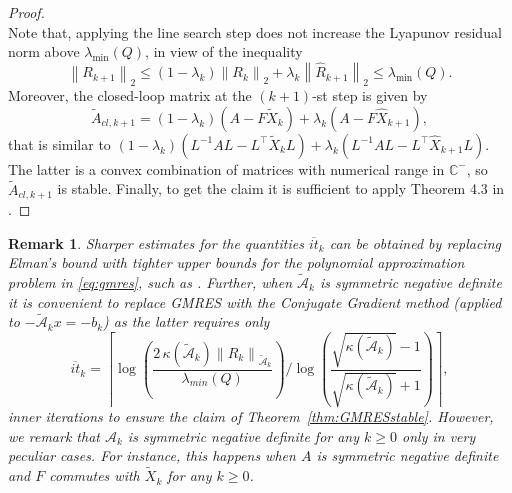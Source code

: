 \documentclass[a4paper,10pt]{article}
\newcommand{\norm}[1]{\left\lVert#1\right\rVert}
\newtheorem{remark}{Remark}
\newcommand{\upd}[1]{{\color{black}#1}} %
\begin{document}
\begin{proof}
$$$$
Note that, applying the line search step does not increase the Lyapunov residual norm above $\lambda_{\min}(Q)$, in view of the inequality
$$
\norm{R_{k+1}}_2\le (1-\lambda_k)\norm{R_k}_2+\lambda_k\norm{\widehat R_{k+1}}_2\le \lambda_{\min}(Q). 
$$  Moreover, the closed-loop matrix at the $(k+1)$\upd{-st} step is given by
$$
\tilde{A}_{cl,k+1}=(1-\lambda_k)(A-F\widetilde X_{k}) +\lambda_k(A-F\widehat X_{k+1}),
$$
that is similar to $(1-\lambda_k)(L^{-1}AL-L^\top\widetilde X_{k}L) +\lambda_k(L^{-1}AL-L^\top\widehat X_{k+1}L) $. The latter is a convex combination of matrices with numerical range in $\mathbb C^{-}$, so $\tilde{A}_{cl,k+1}$ is stable.
Finally, to get the claim it is sufficient to apply Theorem 4.3 in \cite{feitzinger2009inexact}.
\end{proof}


\begin{remark}\label{rem:cg}
Sharper estimates for the quantities $\overline{it}_k$ can be obtained by replacing Elman's bound with tighter upper bounds for the polynomial approximation problem in \eqref{eq:gmres}, such as \cite[Theorem 2.1]{beckerman06}. 
	Further, when $\tilde{\mathcal{A}}_k$ is symmetric negative definite it is convenient to replace GMRES with the Conjugate Gradient  method (applied to $-\tilde{\mathcal A}_k x=-b_k$) as the latter requires only 
$$
	\overline{it}_k = \left\lceil\log\left(\frac{2 \, \kappa(\tilde{\mathcal{A}}_{k}) \norm{R_k }_{\tilde{\mathcal{A}}_{k}}}{\lambda_{min}(Q)} \right)\bigg/\log\left( \frac{\sqrt{\kappa(\tilde{\mathcal{A}}_{k})}-1}{\sqrt{\kappa(\tilde{\mathcal{A}}_{k})}+1} \right)\right\rceil,
$$
inner iterations to ensure the claim of Theorem~\ref{thm:GMRESstable}. However, we remark that $\mathcal A_k$ is symmetric negative definite for any $k\ge 0$ only in very peculiar cases. For instance, this happens when $A$ is symmetric negative definite and $F$ commutes with $\tilde{X}_{k}$ for any $k\ge 0$.



\end{remark}
\end{document}
